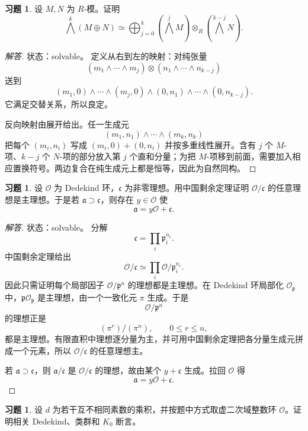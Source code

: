 \documentclass[11pt,a4paper,openany]{ctexbook}
\numberwithin{equation}{chapter}
\theoremstyle{plain}
\theoremstyle{definition}
\newtheorem{exercise}[theorem]{习题}
\theoremstyle{remark}
\begin{document}
\begin{exercise}
设 $M,N$ 为 $R$-模。证明
\[
\bigwedge^k(M\oplus N)\simeq
\bigoplus_{j=0}^k
\left(\bigwedge^jM\right)\otimes_R
\left(\bigwedge^{k-j}N\right).
\]
\end{exercise}

\begin{proof}[解答]
状态：solvable。
定义从右到左的映射：对纯张量
\[
(m_1\wedge\cdots\wedge m_j)\otimes(n_1\wedge\cdots\wedge n_{k-j})
\]
送到
\[
(m_1,0)\wedge\cdots\wedge(m_j,0)\wedge
(0,n_1)\wedge\cdots\wedge(0,n_{k-j}).
\]
它满足交替关系，所以良定。

反向映射由展开给出。任一生成元
\[
(m_1,n_1)\wedge\cdots\wedge(m_k,n_k)
\]
把每个 $(m_i,n_i)$ 写成 $(m_i,0)+(0,n_i)$ 并按多重线性展开。含有 $j$ 个 $M$-项、$k-j$ 个 $N$-项的部分放入第 $j$ 个直和分量；为把 $M$-项移到前面，需要加入相应置换符号。两边复合在纯生成元上都是恒等，因此为自然同构。
\end{proof}

\begin{exercise}
设 $\mathcal O$ 为 Dedekind 环，$\mathfrak c$ 为非零理想。用中国剩余定理证明 $\mathcal O/\mathfrak c$ 的任意理想是主理想。于是若 $\mathfrak a\supset\mathfrak c$，则存在 $y\in\mathcal O$ 使
\[
\mathfrak a=y\mathcal O+\mathfrak c.
\]
\end{exercise}

\begin{proof}[解答]
状态：solvable。
分解
\[
\mathfrak c=\prod_i\mathfrak p_i^{n_i}.
\]
中国剩余定理给出
\[
\mathcal O/\mathfrak c\simeq
\prod_i\mathcal O/\mathfrak p_i^{n_i}.
\]
因此只需证明每个局部因子 $\mathcal O/\mathfrak p^n$ 的理想都是主理想。在 Dedekind 环局部化 $\mathcal O_{\mathfrak p}$ 中，$\mathfrak p\mathcal O_{\mathfrak p}$ 是主理想，由一个一致化元 $\pi$ 生成。于是
\[
\mathcal O/\mathfrak p^n
\]
的理想正是
\[
(\pi^r)/(\pi^n),\qquad 0\le r\le n,
\]
都是主理想。有限直积中理想逐分量为主，并可用中国剩余定理把各分量生成元拼成一个元素，所以 $\mathcal O/\mathfrak c$ 的任意理想主。

若 $\mathfrak a\supset\mathfrak c$，则 $\mathfrak a/\mathfrak c$ 是 $\mathcal O/\mathfrak c$ 的理想，故由某个 $y+\mathfrak c$ 生成。拉回 $\mathcal O$ 得
\[
\mathfrak a=y\mathcal O+\mathfrak c.
\]
\end{proof}

\begin{exercise}
设 $d$ 为若干互不相同素数的乘积，并按题中方式取虚二次域整数环 $\mathcal O$。证明相关 Dedekind、类群和 $K_0$ 断言。
\end{exercise}
\end{document}
